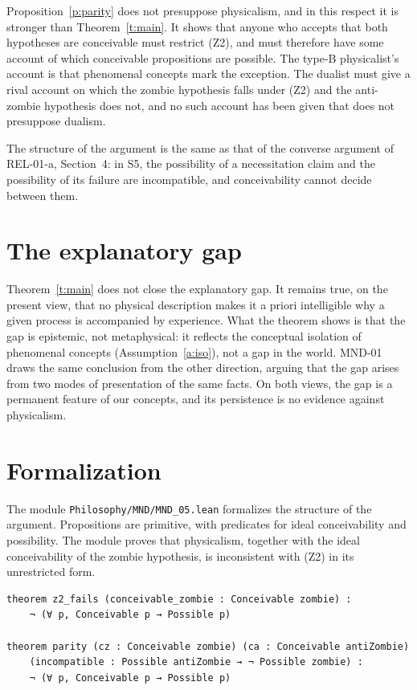 \documentclass{situationist-preprint}
\begin{document}
Proposition~\ref{p:parity} does not presuppose physicalism, and in this respect it is stronger than Theorem~\ref{t:main}. It shows that anyone who accepts that both hypotheses are conceivable must restrict (Z2), and must therefore have some account of which conceivable propositions are possible. The type-B physicalist's account is that phenomenal concepts mark the exception. The dualist must give a rival account on which the zombie hypothesis falls under (Z2) and the anti-zombie hypothesis does not, and no such account has been given that does not presuppose dualism.

The structure of the argument is the same as that of the converse argument of REL-01-a, Section~4: in S5, the possibility of a necessitation claim and the possibility of its failure are incompatible, and conceivability cannot decide between them.

\section{The explanatory gap}

Theorem~\ref{t:main} does not close the explanatory gap. It remains true, on the present view, that no physical description makes it a priori intelligible why a given process is accompanied by experience. What the theorem shows is that the gap is epistemic, not metaphysical: it reflects the conceptual isolation of phenomenal concepts (Assumption~\ref{a:iso}), not a gap in the world. MND-01 draws the same conclusion from the other direction, arguing that the gap arises from two modes of presentation of the same facts. On both views, the gap is a permanent feature of our concepts, and its persistence is no evidence against physicalism.

\section{Formalization}

The module \nolinkurl{Philosophy/MND/MND_05.lean} formalizes the structure of the argument. Propositions are primitive, with predicates for ideal conceivability and possibility. The module proves that physicalism, together with the ideal conceivability of the zombie hypothesis, is inconsistent with (Z2) in its unrestricted form.

\begin{lstlisting}
theorem z2_fails (conceivable_zombie : Conceivable zombie) :
    ¬ (∀ p, Conceivable p → Possible p)

theorem parity (cz : Conceivable zombie) (ca : Conceivable antiZombie)
    (incompatible : Possible antiZombie → ¬ Possible zombie) :
    ¬ (∀ p, Conceivable p → Possible p)
\end{lstlisting}
\end{document}
